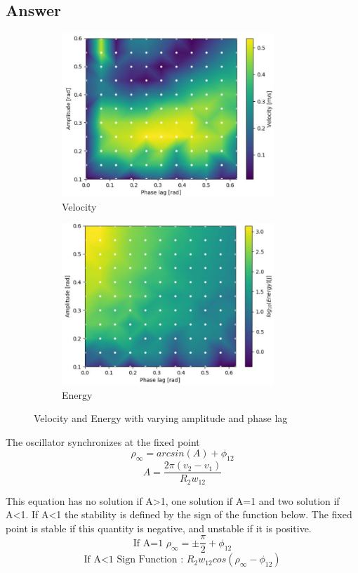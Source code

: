 \documentclass{cmc}
\begin{document}
\subsection*{Answer}

\begin{figure}[H]
 
\begin{subfigure}{0.5\textwidth}
\includegraphics[width=8cm]{9b_vel.JPG}
\caption{Velocity}
\label{fig:9b1}
\end{subfigure}
\begin{subfigure}{0.5\textwidth}
\includegraphics[width=8cm]{9b_en.JPG}
\caption{Energy}
\label{fig:9b2}
\end{subfigure}
 
\caption{Velocity and Energy with varying amplitude and phase lag}
\label{fig:9b}
\end{figure}

The oscillator synchronizes at the fixed point $$ \rho_{\infty}= arcsin(A) + \phi_{12} $$
$$A=\frac{2\pi(v_2-v_1)}{R_2w_{12}}$$

This equation has no solution if A>1, one solution if A=1 and two solution if A<1. If A<1 the stability is defined by the sign of the function below. The fixed point is stable if this quantity is negative, and unstable if it is positive.
$$\mbox{If A=1 }  \rho_{\infty}=\pm \frac{\pi}{2}+\phi_{12}$$
$$\mbox{If A<1 Sign Function : }  R_{2}w_{12}cos(\rho_{\infty}-\phi_{12})$$
\end{document}
